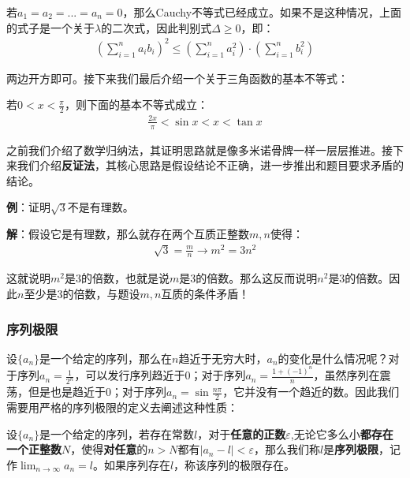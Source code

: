 \documentclass{ctexart}
\let\oldtextbf\textbf %
\renewcommand{\textbf}[1]{\textcolor{btex}{\oldtextbf{#1}}} %
\begin{document}
若$a_1=a_2=...=a_n=0$，那么Cauchy不等式已经成立。如果不是这种情况，上面的式子是一个关于$\lambda$的二次式，因此判别式$\Delta\geq 0$，即：
\begin{align*}
   \left(\sum_{i=1}^n a_ib_i\right)^2\leq\left(\sum_{i=1}^n a_i^2\right)\cdot
\left(\sum_{i=1}^n b_i^2\right)
\end{align*}

两边开方即可。接下来我们最后介绍一个关于三角函数的基本不等式：
\begin{tcolorbox}[
    colback=bac1,     %
    colframe=fra1,   %
    coltitle=white,             %
    coltext=tex1,
    title=三角函数基本不等式,
    fonttitle=\bfseries,        %
arc=3mm,                     %
breakable
]
若$0<x<\frac{\pi}{2}$，则下面的基本不等式成立：
\begin{align*}
    \frac{2x}{\pi}<\sin x<x<\tan x\tag{1-6}
\end{align*}
\end{tcolorbox}

之前我们介绍了数学归纳法，其证明思路就是像多米诺骨牌一样一层层推进。接下来我们介绍\textbf{\color{btex}反证法}，其核心思路是假设结论不正确，进一步推出和题目要求矛盾的结论。

\textbf{\color{btex}例}：证明$\sqrt{3}$不是有理数。

\textbf{\color{btex}解}：假设它是有理数，那么就存在两个互质正整数$m,n$使得：
\begin{align*}
    \sqrt{3}=\frac{m}{n}\to m^2=3n^2
\end{align*}

这就说明$m^2$是3的倍数，也就是说$m$是3的倍数。那么这反而说明$n^2$是3的倍数。因此$n$至少是3的倍数，与题设$m,n$互质的条件矛盾！

\subsubsection{序列极限}
设$\{a_n\}$是一个给定的序列，那么在$n$趋近于无穷大时，$a_n$的变化是什么情况呢？对于序列$a_n=\frac{1}{2^n}$，可以发行序列趋近于0；对于序列$a_n=\frac{1+(-1)^n}{n}$，虽然序列在震荡，但是也是趋近于0；对于序列$a_n=\sin\frac{n\pi}{2}$，它并没有一个趋近的数。因此我们需要用严格的序列极限的定义去阐述这种性质：
\begin{tcolorbox}[
    colback=bac2,     %
    colframe=fra2,   %
    coltitle=white,             %
    coltext=tex2,
    title=序列极限的定义,
    fonttitle=\bfseries,        %
arc=3mm,                     %
breakable
]
设$\{a_n\}$是一个给定的序列，若存在常数$l$，对于\textbf{\color{btex}任意的正数}$\varepsilon$,无论它多么小\textbf{\color{btex}都存在一个正整数}$N$，使得\textbf{\color{btex}对任意}的$n>N$都有$|a_n-l|<\varepsilon$，那么我们称$l$是\textbf{\color{btex}序列极限}，记作$\lim_{n\to\infty}a_n=l$。如果序列存在$l$，称该序列的极限存在。
\end{tcolorbox}
\end{document}
